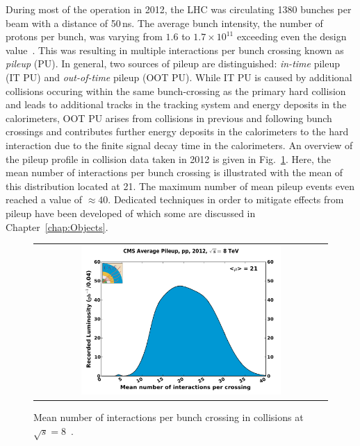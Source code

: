 During most of the operation in 2012, the LHC was circulating 1380 bunches per beam with a distance of 50\,ns. The average bunch intensity, \ie the number of protons per bunch, was varying from $1.6$ to $1.7 \times 10^{11}$ exceeding even the design value~\cite{bib:lhc:lumi12, Lamont:2013cma}. This was resulting in multiple interactions per bunch crossing known as \textit{pileup} (PU). In general, two sources of pileup are distinguished: \textit{in-time} pileup (IT PU) and \textit{out-of-time} pileup (OOT PU). While IT PU is caused by additional \pp collisions occuring within the same bunch-crossing as the primary hard collision and leads to additional tracks in the tracking system and energy deposits in the calorimeters, OOT PU arises from \pp collisions in previous and following bunch crossings and contributes further energy deposits in the calorimeters to the hard interaction due to the finite signal decay time in the calorimeters. An overview of the pileup profile in collision data taken in 2012 is given in Fig.~\ref{fig:lhc_pileup}. Here, the mean number of interactions per bunch crossing is illustrated with the mean of this distribution located at 21. The maximum number of mean pileup events even reached a value of $\approx 40$. Dedicated techniques in order to mitigate effects from pileup have been developed of which some are discussed in Chapter~\ref{chap:Objects}.
\begin{figure}[!t]
  \centering
  \begin{tabular}{c}
    \includegraphics[width=0.7\textwidth]{figures/pileup_pp_2012.pdf} 
  \end{tabular}
  \caption{Mean number of interactions per bunch crossing in \pp collisions at $\sqrt{s} = 8$\tev~\cite{bib:lhc:lumi12}.}
  \label{fig:lhc_pileup}
\end{figure}


